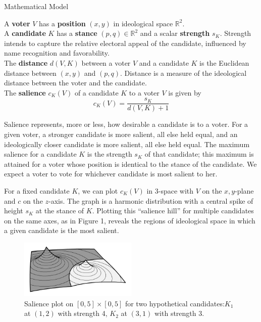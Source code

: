 \documentclass{article}
\newcommand{\noi}{\noindent}
\begin{document}
\begin{section}{Mathematical Model}

A \textbf{voter} $V$ has a \textbf{position} $(x,y)$ in ideological space $\mathbb{R}^2$. \\

\noi A \textbf{candidate} $K$ has a \textbf{stance} $(p,q) \in \mathbb{R}^2$ and a scalar \textbf{strength} $s_K$. Strength intends to capture the relative electoral appeal of the candidate, influenced by name recognition and favorability. \\

\noi The \textbf{distance} $d(V, K)$ between a voter $V$ and a candidate $K$ is the Euclidean distance between $(x,y)$ and $(p,q)$. Distance is a measure of the ideological distance between the voter and the candidate. \\

\noi The \textbf{salience} $c_K(V)$ of a candidate $K$ to a voter $V$ is given by $$c_K(V) = \frac{s_K}{d(V, K) + 1}$$

\noi Salience represents, more or less, how desirable a candidate is to a voter. For a given voter, a stronger candidate is more salient, all else held equal, and an ideologically closer candidate is more salient, all else held equal. The maximum salience for a candidate $K$ is the strength $s_K$ of that candidate; this maximum is attained for a voter whose position is identical to the stance of the candidate. We expect a voter to vote for whichever candidate is most salient to her.

For a fixed candidate $K$, we can plot $c_K(V)$ in 3-space with $V$ on the $x,y$-plane and $c$ on the $z$-axis. The graph is a harmonic distribution with a central spike of height $s_K$ at the stance of $K$. Plotting this ``salience hill'' for multiple candidates on the same axes, as in Figure 1, reveals the regions of ideological space in which a given candidate is the most salient. \\

\begin{figure}[!h]
\centering
\includegraphics[width=0.5\textwidth]{salience_plot.png}
\caption{Salience plot on $[0,5]\times[0,5]$ for two hypothetical candidates:\newline $K_1$ at $(1,2)$ with strength 4, $K_2$ at $(3,1)$ with strength 3.}
\end{figure}


\end{section}
\end{document}
